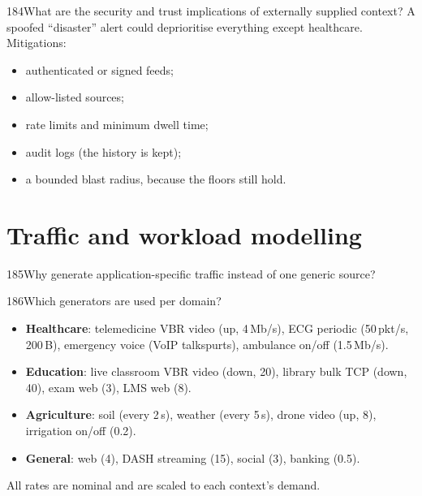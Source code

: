 \begin{qa}{184}{What are the security and trust implications of externally supplied context?}
A spoofed ``disaster'' alert could deprioritise everything except healthcare. Mitigations:
\begin{itemize}
\item authenticated or signed feeds;
\item allow-listed sources;
\item rate limits and minimum dwell time;
\item audit logs (the history is kept);
\item a bounded blast radius, because the floors still hold.
\end{itemize}
\end{qa}

\section{Traffic and workload modelling}

\begin{qa}{185}{Why generate application-specific traffic instead of one generic source?}
\end{qa}

\begin{qa}{186}{Which generators are used per domain?}
\begin{itemize}
\item \textbf{Healthcare}: telemedicine VBR video (up, 4\,Mb/s), ECG periodic (50\,pkt/s, 200\,B), emergency voice
(VoIP talkspurts), ambulance on/off (1.5\,Mb/s).
\item \textbf{Education}: live classroom VBR video (down, 20), library bulk TCP (down, 40), exam web (3), LMS web (8).
\item \textbf{Agriculture}: soil (every 2\,s), weather (every 5\,s), drone video (up, 8), irrigation on/off (0.2).
\item \textbf{General}: web (4), DASH streaming (15), social (3), banking (0.5).
\end{itemize}
All rates are nominal and are scaled to each context's demand.
\end{qa}


